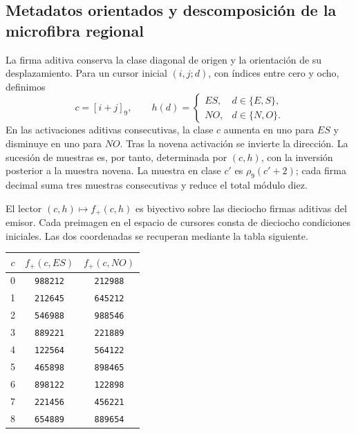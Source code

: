 \subsection{Metadatos orientados y descomposición de la microfibra regional}
\label{sec:microfibra-bipartita-explicita}

La firma aditiva conserva la clase diagonal de origen y la orientación
de su desplazamiento. Para un cursor inicial $(i,j;d)$, con índices entre
cero y ocho, definimos
\[
 c=[i+j]_9,\qquad
 h(d)=\begin{cases}ES,&d\in\{E,S\},\\NO,&d\in\{N,O\}.
 \end{cases}
\]
En las activaciones aditivas consecutivas, la clase $c$ aumenta en uno
para $ES$ y disminuye en uno para $NO$. Tras la novena activación se
invierte la dirección. La sucesión de muestras es, por tanto, determinada
por $(c,h)$, con la inversión posterior a la muestra novena. La muestra
en clase $c'$ es $\rho_9(c'+2)$; cada firma decimal suma tres muestras
consecutivas y reduce el total módulo diez.

\begin{proposition}
El lector $(c,h)\mapsto f_+(c,h)$ es biyectivo sobre las dieciocho
firmas aditivas del emisor. Cada preimagen en el espacio de cursores
consta de dieciocho condiciones iniciales. Las dos coordenadas se
recuperan mediante la tabla siguiente.
\end{proposition}

\begin{center}
\begin{tabular}{c|cc}
\toprule
$c$&$f_+(c,ES)$&$f_+(c,NO)$\\
\midrule
0&\texttt{988212}&\texttt{212988}\\
1&\texttt{212645}&\texttt{645212}\\
2&\texttt{546988}&\texttt{988546}\\
3&\texttt{889221}&\texttt{221889}\\
4&\texttt{122564}&\texttt{564122}\\
5&\texttt{465898}&\texttt{898465}\\
6&\texttt{898122}&\texttt{122898}\\
7&\texttt{221456}&\texttt{456221}\\
8&\texttt{654889}&\texttt{889654}\\
\bottomrule
\end{tabular}
\end{center}

